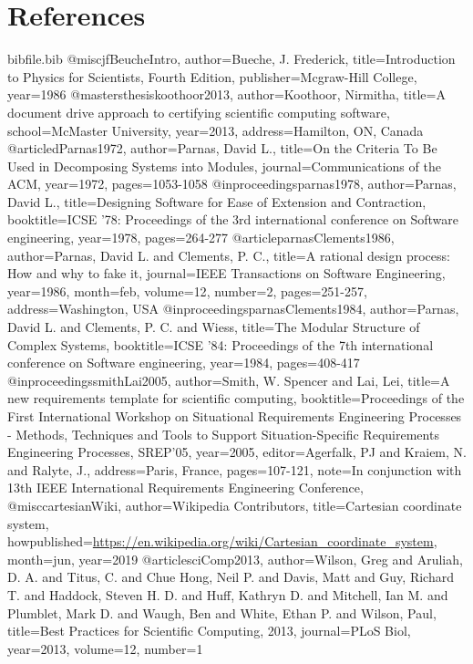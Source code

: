 \documentclass[12pt]{article}
\begin{document}
\section{References}
\label{Sec:References}
\begin{filecontents*}{bibfile.bib}
@misc{jfBeucheIntro,
author={Bueche, J. Frederick},
title={Introduction to Physics for Scientists, Fourth Edition},
publisher={Mcgraw-Hill College},
year={1986}}
@mastersthesis{koothoor2013,
author={Koothoor, Nirmitha},
title={A document drive approach to certifying scientific computing software},
school={McMaster University},
year={2013},
address={Hamilton, ON, Canada}}
@article{dParnas1972,
author={Parnas, David L.},
title={On the Criteria To Be Used in Decomposing Systems into Modules},
journal={Communications of the ACM},
year={1972},
pages={1053-1058}}
@inproceedings{parnas1978,
author={Parnas, David L.},
title={Designing Software for Ease of Extension and Contraction},
booktitle={ICSE '78: Proceedings of the 3rd international conference on Software engineering},
year={1978},
pages={264-277}}
@article{parnasClements1986,
author={Parnas, David L. and Clements, P. C.},
title={A rational design process: How and why to fake it},
journal={IEEE Transactions on Software Engineering},
year={1986},
month=feb,
volume={12},
number={2},
pages={251-257},
address={Washington, USA}}
@inproceedings{parnasClements1984,
author={Parnas, David L. and Clements, P. C. and Wiess},
title={The Modular Structure of Complex Systems},
booktitle={ICSE '84: Proceedings of the 7th international conference on Software engineering},
year={1984},
pages={408-417}}
@inproceedings{smithLai2005,
author={Smith, W. Spencer and Lai, Lei},
title={A new requirements template for scientific computing},
booktitle={Proceedings of the First International Workshop on Situational Requirements Engineering Processes - Methods, Techniques and Tools to Support Situation-Specific Requirements Engineering Processes, SREP'05},
year={2005},
editor={Agerfalk, PJ and Kraiem, N. and Ralyte, J.},
address={Paris, France},
pages={107-121},
note={In conjunction with 13th IEEE International Requirements Engineering Conference,}}
@misc{cartesianWiki,
author={Wikipedia Contributors},
title={Cartesian coordinate system},
howpublished={\url{https://en.wikipedia.org/wiki/Cartesian\_coordinate\_system}},
month=jun,
year={2019}}
@article{sciComp2013,
author={Wilson, Greg and Aruliah, D. A. and Titus, C. and Chue Hong, Neil P. and Davis, Matt and Guy, Richard T. and Haddock, Steven H. D. and Huff, Kathryn D. and Mitchell, Ian M. and Plumblet, Mark D. and Waugh, Ben and White, Ethan P. and Wilson, Paul},
title={Best Practices for Scientific Computing, 2013},
journal={PLoS Biol},
year={2013},
volume={12},
number={1}}
\end{filecontents*}
\nocite{*}
\printbibliography[heading=none]
\end{document}
